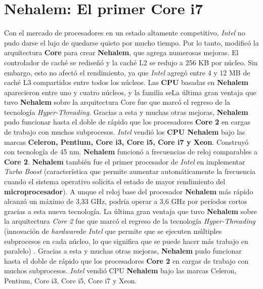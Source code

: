 \section{\textbf{Nehalem}: El primer \textbf{Core i7}}
Con el mercado de procesadores en un estado altamente competitivo, \emph{Intel} no pudo darse el lujo de quedarse quieto por mucho tiempo. Por lo tanto, modificó la
arquitectura \textbf{Core} para crear \textbf{Nehalem}, que agrega numerosas mejoras. El controlador de caché se rediseñó y la caché L2 se redujo a 256 KB por núcleo. Sin embargo,
esto no afectó el rendimiento, ya que \emph{Intel} agregó entre 4 y 12 MB de caché L3 compartidos entre todos los núcleos. Las \textbf{CPU} basadas en \textbf{Nehalem} aparecieron entre
uno y cuatro núcleos, y la familia seLa última gran ventaja que tuvo \textbf{Nehalem} sobre la arquitectura Core fue que marcó el regreso de la tecnología \emph{Hyper-Threading}.
Gracias a esta y muchas otras mejoras, \textbf{Nehalem} pudo funcionar hasta el doble de rápido que los procesadores \textbf{Core 2} en cargas de trabajo con muchos subprocesos.
\emph{Intel} vendió los \textbf{CPU Nehalem} bajo las marcas \textbf{Celeron, Pentium, Core i3, Core i5, Core i7 y Xeon}. Construyó con tecnología de 45 nm. \textbf{Nehalem} funcionó
a frecuencias de reloj comparables a \textbf{Core 2}. \textbf{Nehalem} también fue el primer procesador de \emph{Intel} en implementar \emph{Turbo Boost} (característica que permite
aumentar automáticamente la frecuencia cuando el sistema operativo solicita el estado de mayor rendimiento del \textbf{microprocesador}). A unque el reloj base del procesador
\textbf{Nehalem} más rápido alcanzó un máximo de 3,33 GHz, podría operar a 3,6 GHz por períodos cortos gracias a esta nueva tecnología. La última gran ventaja que tuvo
\textbf{Nehalem} sobre la arquitectura \emph{Core 2} fue que marcó el regreso de la tecnología \emph{Hyper-Threading} (innovación de \emph{hardware}de \emph{Intel} que permite que
se ejecuten múltiples subprocesos en cada núcleo, lo que significa que se puede hacer más trabajo en paralelo) . Gracias a esta y
muchas otras mejoras, \textbf{Nehalem} pudo funcionar hasta el doble de rápido que los procesadores \textbf{Core 2} en cargas de trabajo con muchos subprocesos. \emph{Intel} vendió CPU
\textbf{Nehalem} bajo las marcas Celeron, Pentium, Core i3, Core i5, Core i7 y Xeon.

